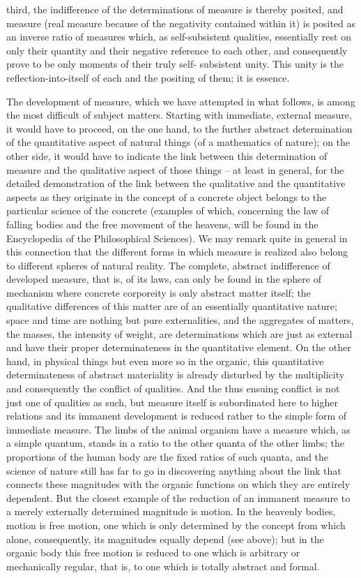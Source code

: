 third, the indifference of the determinations of measure is thereby posited,
and measure (real measure because of the negativity contained within it)
is posited as an inverse ratio of measures which, as self-subsistent qualities,
essentially rest on only their quantity and their negative reference to each
other, and consequently prove to be only moments of their truly self-
subsistent unity. This unity is the reflection-into-itself of each and the
positing of them; it is essence.

The development of measure, which we have attempted in what follows,
is among the most difficult of subject matters.
Starting with immediate,
external measure, it would have to proceed, on the one hand, to the further
abstract determination of the quantitative aspect of natural things (of a
mathematics of nature); on the other side, it would have to indicate the
link between this determination of measure and the qualitative aspect of
those things – at least in general, for the detailed demonstration of the
link between the qualitative and the quantitative aspects as they originate
in the concept of a concrete object belongs to the particular science of
the concrete (examples of which, concerning the law of falling bodies and
the free movement of the heavens, will be found in the Encyclopedia of the
Philosophical Sciences).
We may remark quite in general in this connection
that the different forms in which measure is realized also belong to different
spheres of natural reality.
The complete, abstract indifference of developed
measure, that is, of its laws, can only be found in the sphere of mechanism
where concrete corporeity is only abstract matter itself; the qualitative
differences of this matter are of an essentially quantitative nature; space
and time are nothing but pure externalities, and the aggregates of matters,
the masses, the intensity of weight, are determinations which are just as
external and have their proper determinateness in the quantitative element.
On the other hand, in physical things but even more so in the organic, this
quantitative determinateness of abstract materiality is already disturbed by
the multiplicity and consequently the conflict of qualities. And the thus
ensuing conflict is not just one of qualities as such, but measure itself
is subordinated here to higher relations and its immanent development is
reduced rather to the simple form of immediate measure. The limbs of
the animal organism have a measure which, as a simple quantum, stands
in a ratio to the other quanta of the other limbs; the proportions of the
human body are the fixed ratios of such quanta, and the science of nature
still has far to go in discovering anything about the link that connects
these magnitudes with the organic functions on which they are entirely
dependent. But the closest example of the reduction of an immanent
measure to a merely externally determined magnitude is motion. In the
heavenly bodies, motion is free motion, one which is only determined
by the concept from which alone, consequently, its magnitudes equally
depend (see above); but in the organic body this free motion is reduced
to one which is arbitrary or mechanically regular, that is, to one which is
totally abstract and formal.

